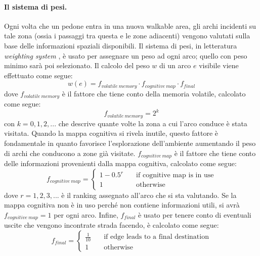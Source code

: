 \documentclass[12pt,a4paper,openright,oneside]{book}
\begin{document}
\paragraph{Il sistema di pesi.}
\label{weighting-system-paragraph}
Ogni volta che un pedone entra in una nuova walkable area, gli archi incidenti su tale zona (ossia i passaggi tra questa e le zone adiacenti) vengono valutati sulla base delle informazioni spaziali disponibili. Il sistema di pesi, in letteratura \emph{weighting system} \cite{Andresen2018}, è usato per assegnare un peso ad ogni arco; quello con peso minimo sarà poi selezionato. Il calcolo del peso \(w\) di un arco \(e\) visibile viene effettuato come segue:
\begin{equation}\label{weighting-system}
w(e) = f_{volatile\ memory}\cdot f_{cognitive\ map}\cdot f_{final}
\end{equation}
dove \(f_{volatile\ memory}\) è il fattore che tiene conto della memoria volatile, calcolato come segue:
\begin{equation}
f_{volatile\ memory} = 2^{k}
\end{equation}
con \(k = 0,1,2,...\) che descrive quante volte la zona a cui l’arco conduce è stata visitata. Quando la mappa cognitiva si rivela inutile, questo fattore è fondamentale in quanto favorisce l’esplorazione dell’ambiente aumentando il peso di archi che conducono a zone già visitate. \(f_{cognitive\ map}\) è il fattore che tiene conto delle informazioni provenienti dalla mappa cognitiva, calcolato come segue:
\begin{equation}
f_{cognitive\ map} =
  \begin{cases}
    1 - 0.5^r     & \quad \text{if cognitive map is in use}\\
    1             & \quad \text{otherwise}
  \end{cases}
\end{equation}
dove \(r = 1,2,3,...\) è il ranking assegnato all'arco che si sta valutando. Se la mappa cognitiva non è in uso perché non contiene informazioni utili, si avrà \(f_{cognitive\ map} = 1\) per ogni arco. Infine, \(f_{final}\) è usato per tenere conto di eventuali uscite che vengono incontrate strada facendo, è calcolato come segue: 
\begin{equation}
f_{final} =
  \begin{cases}
    \frac{1}{10}       & \quad \text{if edge leads to a final destination}\\
    1                  & \quad \text{otherwise}
  \end{cases}
\end{equation}
\end{document}
